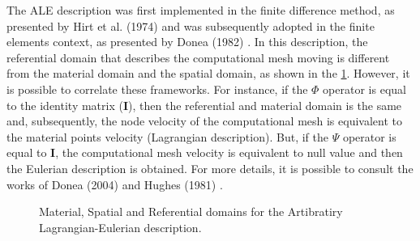 \medskip
The ALE description was first implemented in the finite difference
 method, as presented by Hirt et al. (1974) \cite{hirt1974} 
and was subsequently adopted in the finite elements context, 
as presented by Donea (1982) \cite{donea1982}. In this description, 
the referential domain that describes the computational mesh moving 
is different from the material domain and the spatial domain, 
as shown in the \ref{referential domain}. 
However, it is possible to correlate these 
frameworks. For instance, if the $\Phi$ operator is equal to the 
identity matrix (\textbf{I}), then the referential and material domain 
is the same and, subsequently, the node velocity of the 
computational mesh 
is equivalent to the material points velocity (Lagrangian description). 
But, if the $\Psi$ operator is equal to \textbf{I}, the computational mesh
velocity is equivalent to null value and then the Eulerian description is
obtained. For more details, it is possible to consult the works 
of Donea (2004) \cite{donea2004} and Hughes (1981) \cite{hughes1981}.

\begin{figure}[H]
\begin{center}
\end{center}
\caption{
Material, Spatial and Referential domains for the Artibratiry Lagrangian-Eulerian description.
}
\label{referential domain}
\end{figure}






